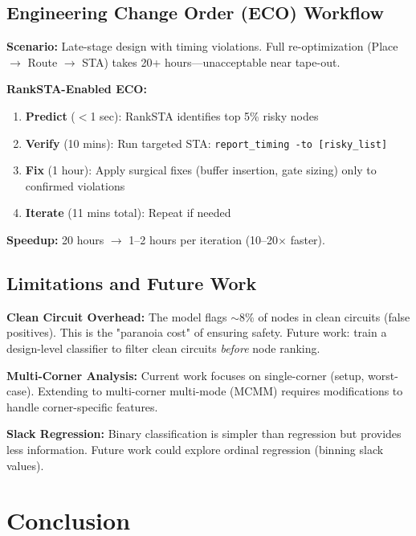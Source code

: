 \subsection{Engineering Change Order (ECO) Workflow}

\textbf{Scenario:} Late-stage design with timing violations. Full re-optimization (Place $\rightarrow$ Route $\rightarrow$ STA) takes 20+ hours---unacceptable near tape-out.

\textbf{RankSTA-Enabled ECO:}
\begin{enumerate}
    \item \textbf{Predict} ($<$1 sec): RankSTA identifies top 5\% risky nodes
    \item \textbf{Verify} (10 mins): Run targeted STA: \texttt{report\_timing -to [risky\_list]}
    \item \textbf{Fix} (1 hour): Apply surgical fixes (buffer insertion, gate sizing) only to confirmed violations
    \item \textbf{Iterate} (11 mins total): Repeat if needed
\end{enumerate}

\textbf{Speedup:} 20 hours $\rightarrow$ 1--2 hours per iteration (10--20$\times$ faster).

\subsection{Limitations and Future Work}

\textbf{Clean Circuit Overhead:} The model flags $\sim$8\% of nodes in clean circuits (false positives). This is the "paranoia cost" of ensuring safety. Future work: train a design-level classifier to filter clean circuits \textit{before} node ranking.

\textbf{Multi-Corner Analysis:} Current work focuses on single-corner (setup, worst-case). Extending to multi-corner multi-mode (MCMM) requires modifications to handle corner-specific features.

\textbf{Slack Regression:} Binary classification is simpler than regression but provides less information. Future work could explore ordinal regression (binning slack values).

\section{Conclusion}
\label{sec:conclusion}

